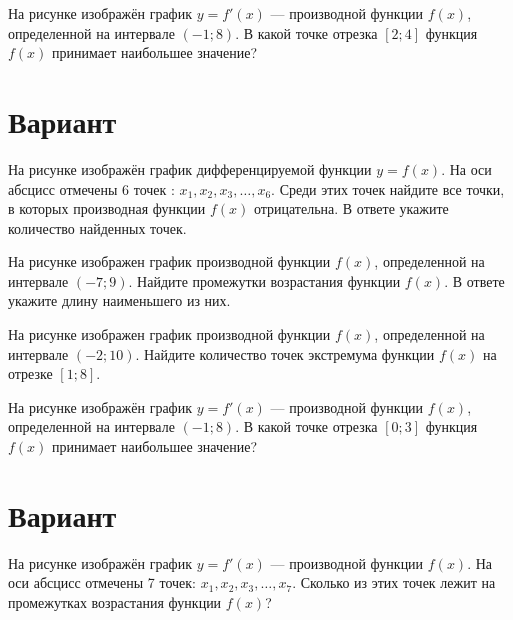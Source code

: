 \begin{taskBN}{4}
На рисунке изображён график $y=f'(x)$ — производной функции $f(x)$, определенной на интервале $(-1;8)$. В какой точке отрезка $[2; 4]$ функция $f(x)$ принимает наибольшее значение?
\end{taskBN}

\newpage\section{Вариант}\begin{taskBN}{1}
На рисунке изображён график дифференцируемой функции $y=f(x)$. На оси абсцисс отмечены 6 точек : $x_1, x_2, x_3, \dots, x_6$. Среди этих точек найдите все точки, в которых производная функции $f(x)$ отрицательна. В ответе укажите количество найденных точек.
\end{taskBN}

\begin{taskBN}{2}
На рисунке изображен график производной функции $f(x)$, определенной на интервале $(-7;9)$. Найдите промежутки возрастания функции $f(x)$. В ответе укажите длину наименьшего из них.
\end{taskBN}

\begin{taskBN}{3}
На рисунке изображен график производной функции $f(x)$, определенной на интервале $(-2;10)$. Найдите количество точек экстремума функции $f(x)$ на отрезке $[1;8]$.
\end{taskBN}

\begin{taskBN}{4}
На рисунке изображён график $y=f'(x)$ — производной функции $f(x)$, определенной на интервале $(-1;8)$. В какой точке отрезка $[0; 3]$ функция $f(x)$ принимает наибольшее значение?
\end{taskBN}

\newpage\section{Вариант}\begin{taskBN}{1}
На рисунке изображён график $y=f'(x)$ — производной функции $f(x)$. На оси абсцисс отмечены 7 точек: $x_1, x_2, x_3, \dots, x_7$. Сколько из этих точек лежит на промежутках возрастания функции $f(x)$?
\end{taskBN}

